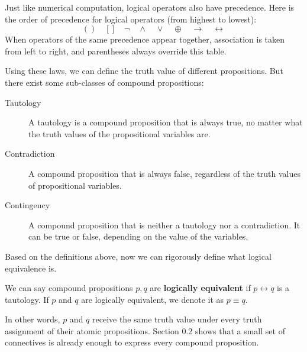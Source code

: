 Just like numerical computation, logical operators also have precedence. Here is the order of precedence for logical operators (from highest to lowest):
$$ ( ) \quad [ ] \quad \neg \quad \wedge \quad \vee \quad \oplus \quad \to \quad \leftrightarrow $$
When operators of the same precedence appear together, association is taken from left to right, and parentheses always override this table.

Using these laws, we can define the truth value of different propositions. But there exist some sub-classes of compound propositions:
\begin{description}
    \item[Tautology] A tautology is a compound proposition that is always true, no matter what the truth values of the propositional variables are.
    \item[Contradiction] A compound proposition that is always false, regardless of the truth values of propositional variables.
    \item[Contingency] A compound proposition that is neither a tautology nor a contradiction. It can be true or false, depending on the value of the variables.
\end{description}

Based on the definitions above, now we can rigorously define what logical equivalence is.

\begin{definition}
We can say compound propositions $p, q$ are \textbf{logically equivalent} if $p \leftrightarrow q$ is a tautology. If $p$ and $q$ are logically equivalent, we denote it as $p \equiv q$.
\end{definition}

In other words, $p$ and $q$ receive the same truth value under every truth assignment of their atomic propositions. Section 0.2 shows that a small set of connectives is already enough to express every compound proposition.

